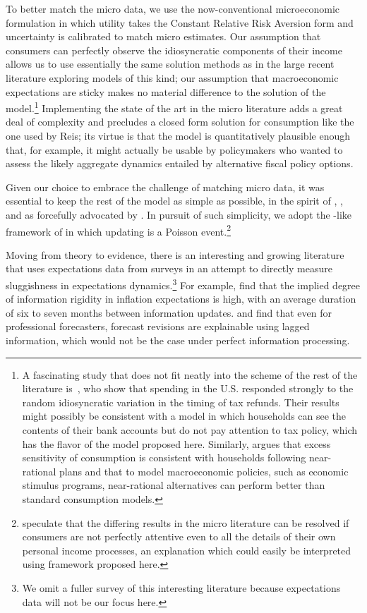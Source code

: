 \documentclass[titlepage]{\econtex}\newcommand{\texname}{cAndCwithStickyE}
\begin{document}
To better match the micro data, we use the now-conventional microeconomic formulation in which utility takes the Constant Relative Risk Aversion form and uncertainty is calibrated to match micro estimates.  Our assumption that consumers can perfectly observe the idiosyncratic components of their income allows us to use essentially the same solution methods as in the large recent literature exploring models of this kind; our assumption that macroeconomic expectations are sticky makes no material difference to the solution of the model.\footnote{A fascinating study that does not fit neatly into the scheme of the rest of the literature is~\cite{jpsTax}, who show that spending in the U.S.  responded strongly to the random idiosyncratic variation in the timing of tax refunds.  Their results might possibly be consistent with a model in which households can see the contents of their bank accounts but do not pay attention to tax policy, which has the flavor of the model proposed here. Similarly, \cite{Kueng:Near-rationality} argues that excess sensitivity of consumption is consistent with households following near-rational plans and that to model macroeconomic policies, such as economic stimulus programs, near-rational alternatives can perform better than standard consumption models.
}  Implementing the state of the art in the micro literature adds a great deal of complexity and precludes a closed form solution for consumption like the one used by Reis; its virtue is that the model is quantitatively plausible enough that, for example, it might actually be usable by policymakers who wanted to assess the likely aggregate dynamics entailed by alternative fiscal policy options.

Given our choice to embrace the challenge of matching micro data, it was essential to keep the rest of the model as simple as possible, in the spirit of \cite{ayNearRational}, \cite{cochrane:nearrational}, \cite{mrSlumps} and as forcefully advocated by \cite{browning&crossley:lifecycle}. In pursuit of such simplicity, we adopt the  \cite{calvoPrices}-like framework of \cite{carroll:epidemicinflQJE} in which updating is a Poisson event.\footnote{\cite{BrowningColladoAER} speculate that the differing results in the micro literature can be resolved if consumers are not perfectly attentive even to all the details of their own personal income processes, an explanation which could easily be interpreted using framework proposed here.}

Moving from theory to evidence, there is an interesting and growing literature that uses expectations data from surveys in an attempt to directly measure sluggishness in expectations dynamics.\footnote{We omit a fuller survey of this interesting literature because expectations data will not be our focus here.} For example, \cite{coibGor:AER15} find that the implied degree of information rigidity in inflation expectations is high, with an average duration of six to seven months between information updates. \cite{fuhrer:JME17} and \cite{fuhrer:IntrinsicPersistence} find that even for professional forecasters, forecast revisions are explainable using lagged information, which would not be the case under perfect information processing.
\end{document}
